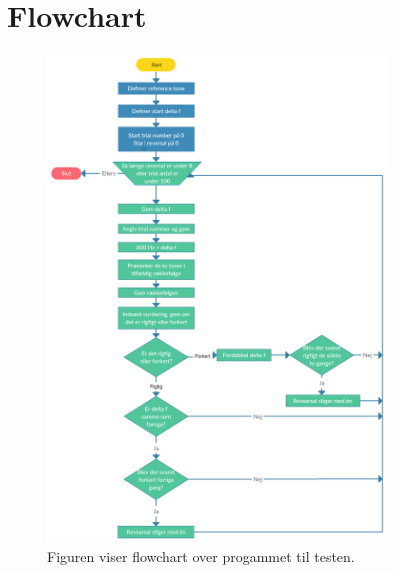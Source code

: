\chapter{Flowchart}
\label{app:Flowchart}

\begin{figure}[H]
	\centering
	\includegraphics[resolution=300,width=0.8\textwidth]{Figure/Flowchart}
	\caption{Figuren viser flowchart over progammet til testen.}
	\label{fig:Flowchart}
\end{figure}
\noindent
